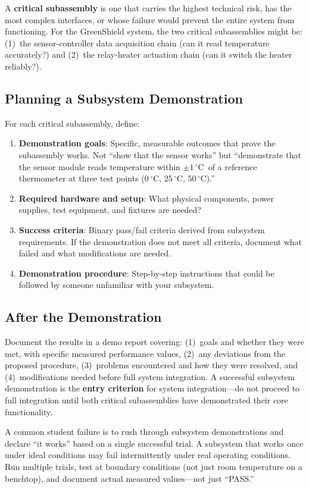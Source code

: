 \documentclass[11pt,letterpaper,twoside,openany]{book}
\newcommand{\degC}{\ensuremath{{}^{\circ}\text{C}}}
\begin{document}
A \textbf{critical subassembly} is one that carries the highest technical risk, has the most complex interfaces, or whose failure would prevent the entire system from functioning. For the GreenShield system, the two critical subassemblies might be: (1)~the sensor-controller data acquisition chain (can it read temperature accurately?) and (2)~the relay-heater actuation chain (can it switch the heater reliably?).

\subsection{Planning a Subsystem Demonstration}
For each critical subassembly, define:
\begin{enumerate}[leftmargin=1.5em]
\item \textbf{Demonstration goals}: Specific, measurable outcomes that prove the subassembly works. Not ``show that the sensor works'' but ``demonstrate that the sensor module reads temperature within $\pm 1$\,\degC\ of a reference thermometer at three test points (0\,\degC, 25\,\degC, 50\,\degC).''
\item \textbf{Required hardware and setup}: What physical components, power supplies, test equipment, and fixtures are needed?
\item \textbf{Success criteria}: Binary pass/fail criteria derived from subsystem requirements. If the demonstration does not meet all criteria, document what failed and what modifications are needed.
\item \textbf{Demonstration procedure}: Step-by-step instructions that could be followed by someone unfamiliar with your subsystem.
\end{enumerate}

\subsection{After the Demonstration}
Document the results in a demo report covering: (1)~goals and whether they were met, with specific measured performance values, (2)~any deviations from the proposed procedure, (3)~problems encountered and how they were resolved, and (4)~modifications needed before full system integration. A successful subsystem demonstration is the \textbf{entry criterion} for system integration---do not proceed to full integration until both critical subassemblies have demonstrated their core functionality.

\begin{warningbox}
A common student failure is to rush through subsystem demonstrations and declare ``it works'' based on a single successful trial. A subsystem that works once under ideal conditions may fail intermittently under real operating conditions. Run multiple trials, test at boundary conditions (not just room temperature on a benchtop), and document actual measured values---not just ``PASS.''
\end{warningbox}
\end{document}
